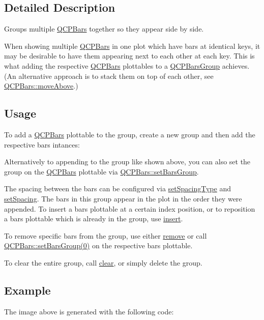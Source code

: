 \subsection{Detailed Description}
Groups multiple \hyperlink{classQCPBars}{Q\+C\+P\+Bars} together so they appear side by side. 



When showing multiple \hyperlink{classQCPBars}{Q\+C\+P\+Bars} in one plot which have bars at identical keys, it may be desirable to have them appearing next to each other at each key. This is what adding the respective \hyperlink{classQCPBars}{Q\+C\+P\+Bars} plottables to a \hyperlink{classQCPBarsGroup}{Q\+C\+P\+Bars\+Group} achieves. (An alternative approach is to stack them on top of each other, see \hyperlink{classQCPBars_ac22e00a6a41509538c21b04f0a57318c}{Q\+C\+P\+Bars\+::move\+Above}.)\hypertarget{classQCPBarsGroup_qcpbarsgroup-usage}{}\subsection{Usage}\label{classQCPBarsGroup_qcpbarsgroup-usage}
To add a \hyperlink{classQCPBars}{Q\+C\+P\+Bars} plottable to the group, create a new group and then add the respective bars intances\+: 
\begin{DoxyCodeInclude}
\end{DoxyCodeInclude}
Alternatively to appending to the group like shown above, you can also set the group on the \hyperlink{classQCPBars}{Q\+C\+P\+Bars} plottable via \hyperlink{classQCPBars_aedd1709061f0b307c47ddb45e172ef9a}{Q\+C\+P\+Bars\+::set\+Bars\+Group}.

The spacing between the bars can be configured via \hyperlink{classQCPBarsGroup_a2c7e2d61b10594a4555b615e1fcaf49e}{set\+Spacing\+Type} and \hyperlink{classQCPBarsGroup_aa553d327479d72a0c3dafcc724a190e2}{set\+Spacing}. The bars in this group appear in the plot in the order they were appended. To insert a bars plottable at a certain index position, or to reposition a bars plottable which is already in the group, use \hyperlink{classQCPBarsGroup_a309a5f7233db189f3ea9c2d04ece6c13}{insert}.

To remove specific bars from the group, use either \hyperlink{classQCPBarsGroup_a215e28a5944f1159013a0e19169220e7}{remove} or call \hyperlink{classQCPBars_aedd1709061f0b307c47ddb45e172ef9a}{Q\+C\+P\+Bars\+:\+:set\+Bars\+Group(0)} on the respective bars plottable.

To clear the entire group, call \hyperlink{classQCPBarsGroup_a3ddf23928c6cd89530bd34ab7ba7b177}{clear}, or simply delete the group.\hypertarget{classQCPBarsGroup_qcpbarsgroup-example}{}\subsection{Example}\label{classQCPBarsGroup_qcpbarsgroup-example}
The image above is generated with the following code\+: 
\begin{DoxyCodeInclude}
\end{DoxyCodeInclude}


